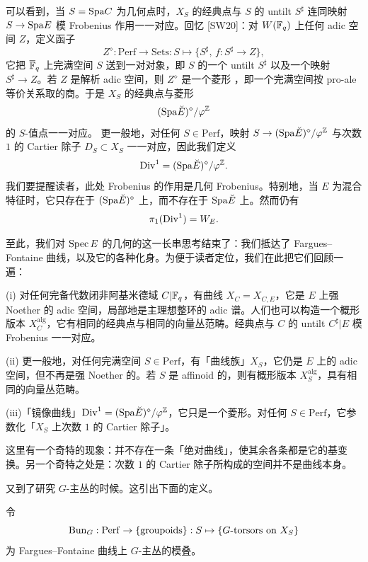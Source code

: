 可以看到，当 $S=\mathrm{Spa} C$ 为几何点时，$X_S$ 的经典点与 $S$ 的 untilt $S^\sharp$ 连同映射 $S\to\mathrm{Spa} E$ 模 Frobenius 作用一一对应。回忆 [SW20]：对 $W(\mathbb{F}_q)$ 上任何 adic 空间 $Z$，定义函子
\[
  Z^\diamond : \mathrm{Perf}\to\mathrm{Sets} : S\mapsto\{S^\sharp,\, f : S^\sharp\to Z\},
\]
它把 $\overline{\mathbb{F}}_q$ 上完满空间 $S$ 送到一对对象，即 $S$ 的一个 untilt $S^\sharp$ 以及一个映射 $S^\sharp\to Z$。若 $Z$ 是解析 adic 空间，则 $Z^\diamond$ 是一个菱形
，即一个完满空间按 pro-ale 等价关系取的商。于是 $X_S$ 的经典点与菱形
\[
  (\mathrm{Spa}\breve{E})^\diamond/\varphi^{\mathbb{Z}}
\]
的 $S$-值点一一对应。
更一般地，对任何 $S\in\mathrm{Perf}$，映射 $S\to(\mathrm{Spa}\breve{E})^\diamond/\varphi^{\mathbb{Z}}$ 与次数 $1$ 的 Cartier 除子 $D_S\subset X_S$ 一一对应，因此我们定义
\[
  \mathrm{Div}^1 = (\mathrm{Spa}\breve{E})^\diamond/\varphi^{\mathbb{Z}}.
\]
我们要提醒读者，此处 Frobenius 的作用是几何 Frobenius。特别地，当 $E$ 为混合特征时，它只存在于 $(\mathrm{Spa}\breve{E})^\diamond$ 上，而不存在于 $\mathrm{Spa}\breve{E}$ 上。然而仍有
\[
  \pi_1(\mathrm{Div}^1) = W_E.
\]

至此，我们对 $\operatorname{Spec} E$ 的几何的这一长串思考结束了：我们抵达了 Fargues–Fontaine 曲线，以及它的各种化身。为便于读者定位，我们在此把它们回顾一遍：

\noindent (i) 对任何完备代数闭非阿基米德域 $C|\mathbb{F}_q$，有曲线 $X_C=X_{C,E}$，它是 $E$ 上强 Noether 的 adic 空间，局部地是主理想整环的 adic 谱。人们也可以构造一个概形版本 $X_C^{\mathrm{alg}}$，它有相同的经典点与相同的向量丛范畴。经典点与 $C$ 的 untilt $C^\sharp|E$ 模 Frobenius 一一对应。

\noindent (ii) 更一般地，对任何完满空间 $S\in\mathrm{Perf}$，有「曲线族」$X_S$，它仍是 $E$ 上的 adic 空间，但不再是强 Noether 的。若 $S$ 是 affinoid 的，则有概形版本 $X_S^{\mathrm{alg}}$，具有相同的向量丛范畴。

\noindent (iii)「镜像曲线」$\mathrm{Div}^1=(\mathrm{Spa}\breve{E})^\diamond/\varphi^{\mathbb{Z}}$，它只是一个菱形。对任何 $S\in\mathrm{Perf}$，它参数化「$X_S$ 上次数 $1$ 的 Cartier 除子」。

这里有一个奇特的现象：并不存在一条「绝对曲线」，使其余各条都是它的基变换。另一个奇特之处是：次数 $1$ 的 Cartier 除子所构成的空间并不是曲线本身。

又到了研究 $G$-主丛的时候。这引出下面的定义。

\begin{definition}%
令
\[
  \mathrm{Bun}_G : \mathrm{Perf}\to\{\text{groupoids}\} : S\mapsto\{G\text{-torsors on }X_S\}
\]
为 Fargues–Fontaine 曲线上 $G$-主丛的模叠。
\end{definition}

